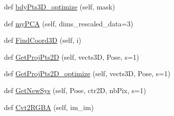 \begin{DoxyCompactItemize}
\item 
def \hyperlink{class_r_g_b_d_1_1_r_g_b_d_a7565e3c0d9929b23e94ce900df4af67a}{bdy\+Pts3\+D\+\_\+optimize} (self, mask)
\item 
def \hyperlink{class_r_g_b_d_1_1_r_g_b_d_a62a33614ece39d6ddd215f9faae0bc4d}{my\+P\+CA} (self, dims\+\_\+rescaled\+\_\+data=3)
\item 
def \hyperlink{class_r_g_b_d_1_1_r_g_b_d_a345e2077de5144592ad36c57885ba836}{Find\+Coord3D} (self, i)
\item 
def \hyperlink{class_r_g_b_d_1_1_r_g_b_d_a58c29e9445dde3116abaf4ece69a5c71}{Get\+Proj\+Pts2D} (self, vects3D, Pose, s=1)
\item 
def \hyperlink{class_r_g_b_d_1_1_r_g_b_d_a9213368288cc80787b00a71927fc2ad1}{Get\+Proj\+Pts2\+D\+\_\+optimize} (self, vects3D, Pose, s=1)
\item 
def \hyperlink{class_r_g_b_d_1_1_r_g_b_d_ae3ffd53a2aef9f3d955fe40887fe88c1}{Get\+New\+Sys} (self, Pose, ctr2D, nb\+Pix, s=1)
\item 
def \hyperlink{class_r_g_b_d_1_1_r_g_b_d_a5e84e29e01792dc088319af0130e201c}{Cvt2\+R\+G\+BA} (self, im\+\_\+im)
\end{DoxyCompactItemize}
